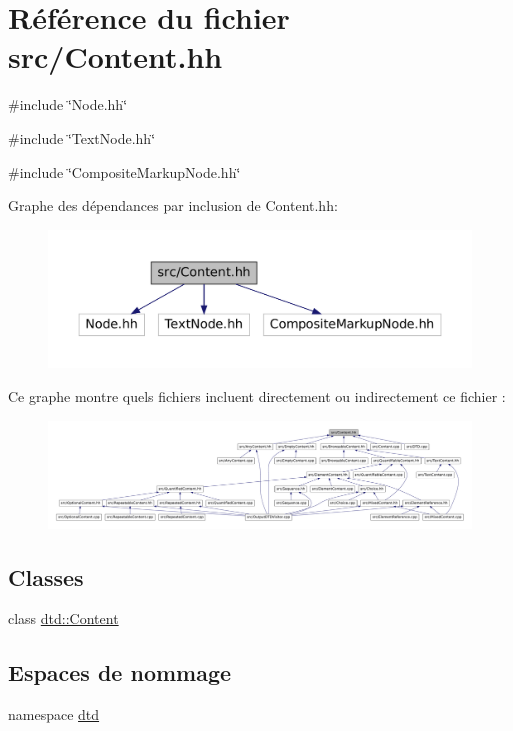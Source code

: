 \hypertarget{_content_8hh}{
\section{Référence du fichier src/Content.hh}
\label{_content_8hh}
}
{\ttfamily \#include \char`\"{}Node.hh\char`\"{}}\par
{\ttfamily \#include \char`\"{}TextNode.hh\char`\"{}}\par
{\ttfamily \#include \char`\"{}CompositeMarkupNode.hh\char`\"{}}\par
Graphe des dépendances par inclusion de Content.hh:\nopagebreak
\begin{figure}[H]
\begin{center}
\leavevmode
\includegraphics[width=400pt]{_content_8hh__incl}
\end{center}
\end{figure}
Ce graphe montre quels fichiers incluent directement ou indirectement ce fichier :\nopagebreak
\begin{figure}[H]
\begin{center}
\leavevmode
\includegraphics[width=400pt]{_content_8hh__dep__incl}
\end{center}
\end{figure}
\subsection*{Classes}
\begin{DoxyCompactItemize}
\item 
class \hyperlink{classdtd_1_1_content}{dtd::Content}
\end{DoxyCompactItemize}
\subsection*{Espaces de nommage}
\begin{DoxyCompactItemize}
\item 
namespace \hyperlink{namespacedtd}{dtd}
\end{DoxyCompactItemize}
